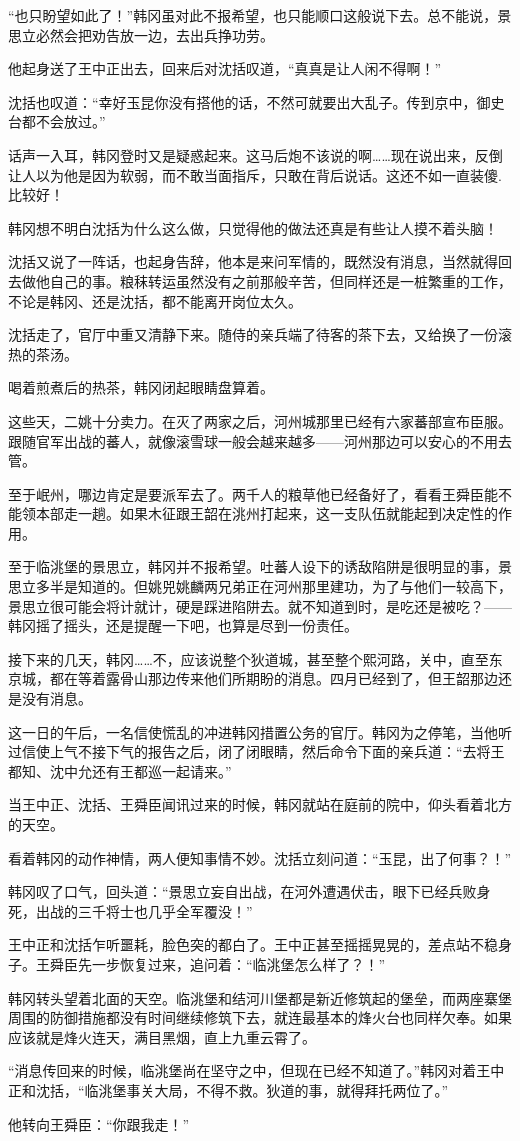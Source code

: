 “也只盼望如此了！”韩冈虽对此不报希望，也只能顺口这般说下去。总不能说，景思立必然会把劝告放一边，去出兵挣功劳。

他起身送了王中正出去，回来后对沈括叹道，“真真是让人闲不得啊！”

沈括也叹道：“幸好玉昆你没有搭他的话，不然可就要出大乱子。传到京中，御史台都不会放过。”

话声一入耳，韩冈登时又是疑惑起来。这马后炮不该说的啊……现在说出来，反倒让人以为他是因为软弱，而不敢当面指斥，只敢在背后说话。这还不如一直装傻.比较好！

韩冈想不明白沈括为什么这么做，只觉得他的做法还真是有些让人摸不着头脑！

沈括又说了一阵话，也起身告辞，他本是来问军情的，既然没有消息，当然就得回去做他自己的事。粮秣转运虽然没有之前那般辛苦，但同样还是一桩繁重的工作，不论是韩冈、还是沈括，都不能离开岗位太久。

沈括走了，官厅中重又清静下来。随侍的亲兵端了待客的茶下去，又给换了一份滚热的茶汤。

喝着煎煮后的热茶，韩冈闭起眼睛盘算着。

这些天，二姚十分卖力。在灭了两家之后，河州城那里已经有六家蕃部宣布臣服。跟随官军出战的蕃人，就像滚雪球一般会越来越多——河州那边可以安心的不用去管。

至于岷州，哪边肯定是要派军去了。两千人的粮草他已经备好了，看看王舜臣能不能领本部走一趟。如果木征跟王韶在洮州打起来，这一支队伍就能起到决定性的作用。

至于临洮堡的景思立，韩冈并不报希望。吐蕃人设下的诱敌陷阱是很明显的事，景思立多半是知道的。但姚兕姚麟两兄弟正在河州那里建功，为了与他们一较高下，景思立很可能会将计就计，硬是踩进陷阱去。就不知道到时，是吃还是被吃？——韩冈摇了摇头，还是提醒一下吧，也算是尽到一份责任。

接下来的几天，韩冈……不，应该说整个狄道城，甚至整个熙河路，关中，直至东京城，都在等着露骨山那边传来他们所期盼的消息。四月已经到了，但王韶那边还是没有消息。

这一日的午后，一名信使慌乱的冲进韩冈措置公务的官厅。韩冈为之停笔，当他听过信使上气不接下气的报告之后，闭了闭眼睛，然后命令下面的亲兵道：“去将王都知、沈中允还有王都巡一起请来。”

当王中正、沈括、王舜臣闻讯过来的时候，韩冈就站在庭前的院中，仰头看着北方的天空。

看着韩冈的动作神情，两人便知事情不妙。沈括立刻问道：“玉昆，出了何事？！”

韩冈叹了口气，回头道：“景思立妄自出战，在河外遭遇伏击，眼下已经兵败身死，出战的三千将士也几乎全军覆没！”

王中正和沈括乍听噩耗，脸色突的都白了。王中正甚至摇摇晃晃的，差点站不稳身子。王舜臣先一步恢复过来，追问着：“临洮堡怎么样了？！”

韩冈转头望着北面的天空。临洮堡和结河川堡都是新近修筑起的堡垒，而两座寨堡周围的防御措施都没有时间继续修筑下去，就连最基本的烽火台也同样欠奉。如果应该就是烽火连天，满目黑烟，直上九重云霄了。

“消息传回来的时候，临洮堡尚在坚守之中，但现在已经不知道了。”韩冈对着王中正和沈括，“临洮堡事关大局，不得不救。狄道的事，就得拜托两位了。”

他转向王舜臣：“你跟我走！”

